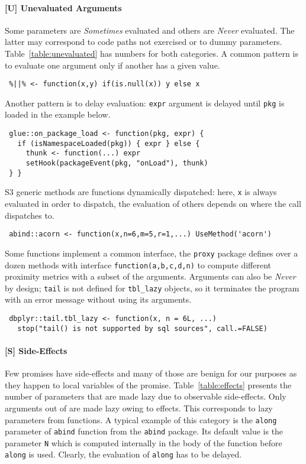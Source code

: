 \documentclass[screen,acmsmall]{acmart}
\newcommand{\sometimes}{\emph{Sometimes}\xspace}
\newcommand{\never}{\emph{Never}\xspace}
\newcommand{\code}[1]{\lstinline |#1|\xspace}
\renewcommand{\c}[1]{\lstinline |#1|\xspace}
\begin{document}
\paragraph{{\normalfont \textbf{[U]}} Unevaluated Arguments}
Some parameters are \sometimes evaluated and others are \never evaluated. The
latter may correspond to code paths not exercised or to dummy parameters.
Table~\ref{table:unevaluated} has numbers for both categories. A common pattern
is to evaluate one argument only if another has a given value.

\begin{lstlisting}
 %||% <- function(x,y) if(is.null(x)) y else x
\end{lstlisting}

Another pattern is to delay evaluation: \c{expr} argument is delayed until
\c{pkg} is loaded in the example below.

\begin{lstlisting}
 glue::on_package_load <- function(pkg, expr) {
   if (isNamespaceLoaded(pkg)) { expr } else {
     thunk <- function(...) expr
     setHook(packageEvent(pkg, "onLoad"), thunk)
 } }
\end{lstlisting}

S3 generic methods are functions dynamically dispatched: here, \c x is always
evaluated in order to dispatch, the evaluation of others depends on where the
call dispatches to.

\begin{lstlisting}
 abind::acorn <- function(x,n=6,m=5,r=1,...) UseMethod('acorn')
\end{lstlisting}

Some functions implement a common interface, the \c{proxy} package defines over
a dozen methods with interface \c{function(a,b,c,d,n)} to compute different
proximity metrics with a subset of the arguments. Arguments can also be \never
by design; \c{tail} is not defined for \c{tbl_lazy} objects, so it terminates
the program with an error message without using its arguments.

\begin{lstlisting}
 dbplyr::tail.tbl_lazy <- function(x, n = 6L, ...)
   stop("tail() is not supported by sql sources", call.=FALSE)
\end{lstlisting}


\paragraph{{\normalfont \textbf{[S]}} Side-Effects}
Few promises have side-effects and many of those are benign for our purposes as
they happen to local variables of the promise. Table~\ref{table:effects}
presents the number of parameters that are made lazy due to observable
side-effects. Only \EffectCountArgumentsTotal arguments out of
\TotalArgumentCount are made lazy owing to effects. This corresponds to
\EffectCountParametersTotal lazy parameters from \EffectCountFunctionsTotal
functions. A typical example of this category is the \code{along} parameter of
\code{abind} function from the \code{abind} package. Its default value is the
parameter \code{N} which is computed internally in the body of the function
before \code{along} is used. Clearly, the evaluation of \code{along} has to be
delayed.
\end{document}
